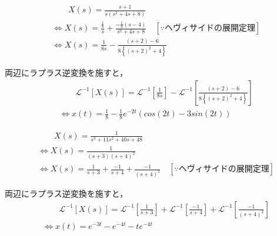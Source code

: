 \documentclass[a4paper,12pt]{article}
\begin{document}
\begin{tcolorbox}[title={ [12] (4) \( X(s)=\frac{ s + 1 }{ s ( s^2 + 4s + 8 ) } \)}]
\vspace{-3mm}
\begin{align*}
    &\qquad X(s) =\frac{ s + 1 }{ s ( s^2 + 4s + 8 ) }  \\
    &\Leftrightarrow X(s) 
    = \frac{ \frac{1}{8} }{s}
    +\frac{ -\frac{1}{8}(s-4) }{ s^2 + 4s + 8 } 
    \quad [\because ヘヴィサイドの展開定理]\\
    &\Leftrightarrow X(s) 
    =\frac{1}{8s}
    -\frac{ (s+2)-6}{8\left\{(s+2)^2 + 4 \right\}}
\end{align*}

\quad 両辺にラプラス逆変換を施すと，
\vspace{-3mm}
\begin{align*}
    &\qquad \mathcal{L}^{-1} \left[ X(s) \right] 
    =\mathcal{L}^{-1} \left[ \frac{1}{8s} \right]
    -\mathcal{L}^{-1} \left[ \frac{ (s+2)-6}{8\left\{(s+2)^2 + 4 \right\}} \right] \\
    &\Leftrightarrow x(t) = \frac{1}{8} - \frac{1}{8}e^{-2t}(cos(2t)-3sin(2t))
\end{align*}
\end{tcolorbox}
\begin{tcolorbox}[title={ [12] (5) \( X(s)=\frac{ 1 }{ s^3 + 11 s^2+ 40s + 48 } \) }]
\vspace{-3mm}
\begin{align*}
    &\qquad X(s) =\frac{ 1 }{ s^3 + 11 s^2+ 40s + 48 }  \\
    &\Leftrightarrow X(s) =\frac{ 1 }{ (s+3)(s+4)^2 }  \\
    &\Leftrightarrow X(s) 
    = \frac{1}{s+3}
    + \frac{-1}{s + 4}
    + \frac{-1}{(s + 4)^2}
    \quad [\because ヘヴィサイドの展開定理]
\end{align*}

\quad 両辺にラプラス逆変換を施すと，
\vspace{-3mm}
\begin{align*}
    &\qquad \mathcal{L}^{-1} \left[ X(s) \right] 
    =\mathcal{L}^{-1} \left[ \frac{1}{s+3} \right]
    +\mathcal{L}^{-1} \left[ \frac{-1}{s + 4} \right]
    +\mathcal{L}^{-1} \left[ \frac{-1}{(s + 4)^2} \right] \\
    &\Leftrightarrow x(t) = e^{-3t} - e^{-4t} - te^{-4t}
\end{align*}
\end{tcolorbox}
\end{document}
